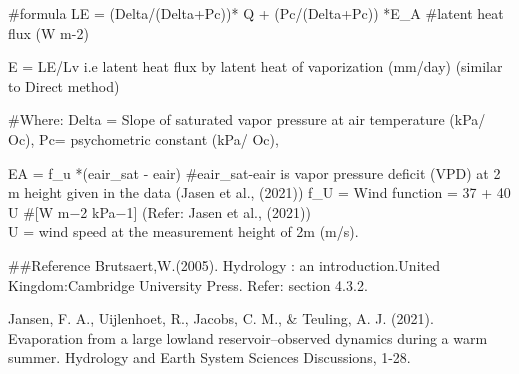\documentclass[
]{article}
\begin{document}
\#formula LE = (Delta/(Delta+Pc))* Q + (Pc/(Delta+Pc)) *E\_A \#latent
heat flux (W m-2)

E = LE/Lv i.e latent heat flux by latent heat of vaporization (mm/day)
(similar to Direct method)

\#Where: Delta = Slope of saturated vapor pressure at air temperature
(kPa/ Oc), Pc= psychometric constant (kPa/ Oc),

EA = f\_u *(eair\_sat - eair) \#eair\_sat-eair is vapor pressure deficit
(VPD) at 2 m height given in the data (Jasen et al., (2021)) f\_U = Wind
function = 37 + 40 U \#{[}W m−2 kPa−1{]} (Refer: Jasen et al., (2021))\\
U = wind speed at the measurement height of 2m (m/s).

\#\#Reference Brutsaert,W.(2005). Hydrology : an introduction.United
Kingdom:Cambridge University Press. Refer: section 4.3.2.

Jansen, F. A., Uijlenhoet, R., Jacobs, C. M., \& Teuling, A. J. (2021).
Evaporation from a large lowland reservoir--observed dynamics during a
warm summer. Hydrology and Earth System Sciences Discussions, 1-28.
\end{document}
